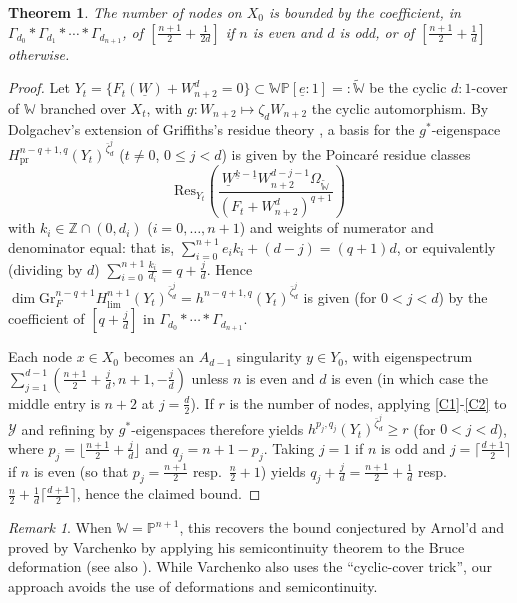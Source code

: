 \documentclass[12pt,letterpaper,english]{amsart}
\numberwithin{equation}{section}
\numberwithin{figure}{section}
\theoremstyle{plain}
\newtheorem{thm}[equation]{Theorem}
\theoremstyle{remark}
\newtheorem{rem}[equation]{Remark}
\theoremstyle{definition}
\theoremstyle{definition}
\theoremstyle{plain}
\theoremstyle{plain}
\theoremstyle{plain}
\theoremstyle{plain}
\theoremstyle{definition}
\def\ZZ{\mathbb{Z}}
\def\PP{\mathbb{P}}
\def\Y{\mathcal{Y}}
\def\Y{\mathcal{Y}}
\def\WW{\mathbb{W}}
\def\WP{\mathbb{WP}}
\def\UW{\underline{W}}
\def\ue{\underline{e}}
\theoremstyle{definition}
\begin{document}
\begin{thm}\label{C4}
The number of nodes on $X_0$ is bounded by the coefficient, in $\Gamma_{d_0}*\Gamma_{d_1}*\cdots*\Gamma_{d_{n+1}}$, of $[\tfrac{n+1}{2}+\tfrac{1}{2d}]$ if $n$ is even and $d$ is odd, or of $[\tfrac{n+1}{2}+\tfrac{1}{d}]$ otherwise.	
\end{thm}
\begin{proof}
Let $Y_t=\{F_t(\UW)+W_{n+2}^d=0\}\subset \WP[\ue{:}1]=:\widetilde{\WW}$ be the cyclic $d{:}1$-cover of $\WW$ branched over $X_t$, with $g\colon W_{n+2}\mapsto \zeta_d W_{n+2}$ the cyclic automorphism. By Dolgachev's extension of Griffiths's residue theory \cite{Do}, a basis for the $g^*$-eigenspace $H^{n-q+1,q}_{\text{pr}}(Y_t)^{\bar{\zeta}_d^j}$ ($t\neq 0$, $0\leq j<d$) is given by the Poincar\'e residue classes $$\mathrm{Res}_{Y_t}\left(\frac{\UW^{\underline{k}-\underline{1}}W_{n+2}^{d-j-1}\Omega_{\widetilde{\WW}}}{(F_t+W_{n+2}^d)^{q+1}}\right)$$
with $k_i\in \ZZ\cap (0,d_i)$ ($i=0,\ldots,n+1$) and weights of numerator and denominator equal:  that is, $\sum_{i=0}^{n+1}e_ik_i+(d-j)=(q+1)d$, or equivalently (dividing by $d$) $\sum_{i=0}^{n+1}\tfrac{k_i}{d_i}=q+\tfrac{j}{d}$. Hence $\dim \mathrm{Gr}_F^{n-q+1} H_{\lim}^{n+1}(Y_t)^{\bar{\zeta}_d^j}=h^{n-q+1,q}(Y_t)^{\bar{\zeta}_d^j}$ is given (for $0<j<d$) by the coefficient of $[q+\tfrac{j}{d}]$ in $\Gamma_{d_0}*\cdots*\Gamma_{d_{n+1}}$.

Each node $x\in X_0$ becomes an $A_{d-1}$ singularity $y\in Y_0$, with eigenspectrum $\sum_{j=1}^{d-1}(\tfrac{n+1}{2}+\tfrac{j}{d},n+1,-\tfrac{j}{d})$ unless $n$ is even and $d$ is even (in which case the middle entry is $n+2$ at $j=\tfrac{d}{2}$). If $r$ is the number of nodes, applying \eqref{C1}-\eqref{C2} to $\Y$ and refining by $g^*$-eigenspaces therefore yields $h^{p_j,q_j}(Y_t)^{\bar{\zeta}_d^j}\geq r$ (for $0<j<d$), where $p_j=\lfloor \tfrac{n+1}{2}+\tfrac{j}{d}\rfloor$ and $q_j=n+1-p_j$.  Taking $j=1$ if $n$ is odd and $j=\lceil \tfrac{d+1}{2}\rceil$ if $n$ is even (so that $p_j=\tfrac{n+1}{2}$ resp.~$\tfrac{n}{2}+1$) yields $q_j+\tfrac{j}{d}=\tfrac{n+1}{2}+\tfrac{1}{d}$ resp.~$\tfrac{n}{2}+\tfrac{1}{d}\lceil\tfrac{d+1}{2}\rceil$, hence the claimed bound.
\end{proof}

\begin{rem}\label{C5}
When $\WW=\PP^{n+1}$, this recovers the bound conjectured by Arnol'd \cite{Ar} and proved by Varchenko by applying his semicontinuity theorem to the Bruce deformation \cite{Va} (see also \cite{vS2}).
While Varchenko also uses the ``cyclic-cover trick'', our approach avoids the use of deformations and semicontinuity.
\end{rem}
\end{document}

